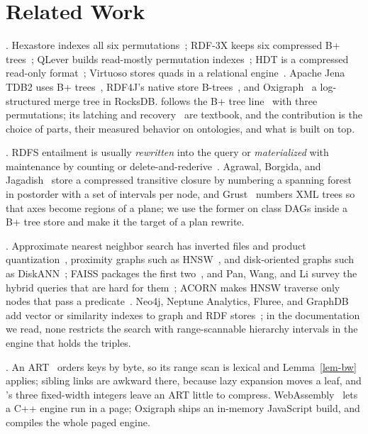 \section{Related Work}
\label{sec-related}



.
Hexastore indexes all six permutations~\cite{weiss2008}; RDF-3X keeps six
compressed B+ trees~\cite{neumann2010}; QLever builds read-mostly permutation
indexes~\cite{bast2017}; HDT is a compressed read-only format~\cite{fernandez2013};
Virtuoso stores quads in a relational engine~\cite{erling2010}.
Apache Jena TDB2 uses B+ trees~\cite{jenatdb}, RDF4J's native store
B-trees~\cite{rdf4j}, and Oxigraph~\cite{oxigraph} a log-structured merge tree in
RocksDB.
\sys follows the B+ tree line~\cite{bayer1972,comer1979} with three permutations;
its latching and recovery~\cite{lehman1981,graefe2011,mohan1992} are textbook, and
the contribution is the choice of parts, their measured behavior on ontologies,
and what is built on top.

.
RDFS entailment is usually \emph{rewritten} into the query or \emph{materialized}
with maintenance by counting or delete-and-rederive~\cite{rdfox,gupta1993}.
Agrawal, Borgida, and Jagadish~\cite{agrawal1989} store a compressed transitive
closure by numbering a spanning forest in postorder with a set of intervals per
node, and Grust~\cite{grust2002} numbers XML trees so that axes become regions of
a plane; we use the former on class DAGs inside a B+ tree store and make it the
target of a plan rewrite.

.
Approximate nearest neighbor search has inverted files and product
quantization~\cite{jegou2011}, proximity graphs such as HNSW~\cite{malkov2020},
and disk-oriented graphs such as DiskANN~\cite{subramanya2019}; FAISS packages
the first two~\cite{johnson2021}, and Pan, Wang, and Li survey the hybrid queries
that are hard for them~\cite{pan2024}; ACORN makes HNSW traverse only nodes that
pass a predicate~\cite{patel2024}.
Neo4j, Neptune Analytics, Fluree, and GraphDB add vector or similarity indexes to
graph and RDF stores~\cite{neo4jvec,neptunevec,fluree,graphdbsim}; in the
documentation we read, none restricts the search with range-scannable hierarchy
intervals in the engine that holds the triples.

.
An ART~\cite{leis2013} orders keys by byte, so its range scan is lexical and
Lemma~\ref{lem-bw} applies; sibling links are awkward there, because lazy
expansion moves a leaf, and \sys's three fixed-width integers leave an ART little
to compress.
WebAssembly~\cite{haas2017} lets a C++ engine run in a page; Oxigraph ships an
in-memory JavaScript build, and \sys compiles the whole paged engine.
